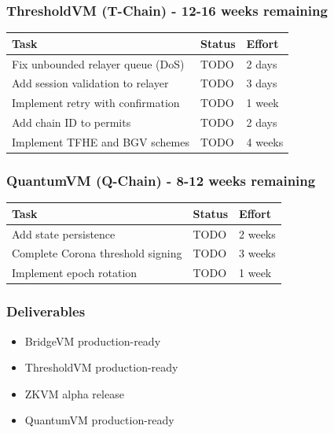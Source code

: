 \documentclass[
]{article}
\newcounter{none} %
\providecommand{\tightlist}{%
  \setlength{\itemsep}{0pt}\setlength{\parskip}{0pt}}
\begin{document}
\subsubsection{ThresholdVM (T-Chain) - 12-16 weeks
remaining}\label{thresholdvm-t-chain---12-16-weeks-remaining}

{\def\LTcaptype{none} %
\begin{longtable}[]{@{}lll@{}}
\toprule\noalign{}
Task & Status & Effort \\
\midrule\noalign{}
\endhead
\bottomrule\noalign{}
\endlastfoot
Fix unbounded relayer queue (DoS) & TODO & 2 days \\
Add session validation to relayer & TODO & 3 days \\
Implement retry with confirmation & TODO & 1 week \\
Add chain ID to permits & TODO & 2 days \\
Implement TFHE and BGV schemes & TODO & 4 weeks \\
\end{longtable}
}

\subsubsection{QuantumVM (Q-Chain) - 8-12 weeks
remaining}\label{quantumvm-q-chain---8-12-weeks-remaining}

{\def\LTcaptype{none} %
\begin{longtable}[]{@{}lll@{}}
\toprule\noalign{}
Task & Status & Effort \\
\midrule\noalign{}
\endhead
\bottomrule\noalign{}
\endlastfoot
Add state persistence & TODO & 2 weeks \\
Complete Corona threshold signing & TODO & 3 weeks \\
Implement epoch rotation & TODO & 1 week \\
\end{longtable}
}

\subsubsection{Deliverables}\label{deliverables-1}

\begin{itemize}
\tightlist
\item[$\square$]
  BridgeVM production-ready
\item[$\square$]
  ThresholdVM production-ready
\item[$\square$]
  ZKVM alpha release
\item[$\square$]
  QuantumVM production-ready
\end{itemize}
\end{document}
